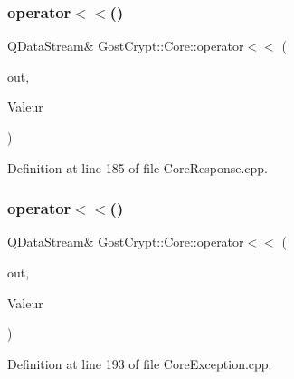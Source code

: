 \mbox{\label{namespace_gost_crypt_1_1_core_a160514e5b1de3db29b884733543a04d0}} 
\subsubsection{\texorpdfstring{operator$<$$<$()}{operator<<()}\hspace{0.1cm}{\footnotesize\ttfamily [33/56]}}
{\footnotesize\ttfamily Q\+Data\+Stream\& Gost\+Crypt\+::\+Core\+::operator$<$$<$ (\begin{DoxyParamCaption}\item[{Q\+Data\+Stream \&}]{out,  }\item[{const \hyperlink{struct_gost_crypt_1_1_core_1_1_host_device}{Host\+Device} \&}]{Valeur }\end{DoxyParamCaption})}



Definition at line 185 of file Core\+Response.\+cpp.

\mbox{\label{namespace_gost_crypt_1_1_core_af50154c27c4dd88f7d66319d7897db4b}} 
\subsubsection{\texorpdfstring{operator$<$$<$()}{operator<<()}\hspace{0.1cm}{\footnotesize\ttfamily [34/56]}}
{\footnotesize\ttfamily Q\+Data\+Stream\& Gost\+Crypt\+::\+Core\+::operator$<$$<$ (\begin{DoxyParamCaption}\item[{Q\+Data\+Stream \&}]{out,  }\item[{const \hyperlink{class_gost_crypt_1_1_core_1_1_formatting_sub_exception}{Gost\+Crypt\+::\+Core\+::\+Formatting\+Sub\+Exception} \&}]{Valeur }\end{DoxyParamCaption})}



Definition at line 193 of file Core\+Exception.\+cpp.

\mbox{\label{namespace_gost_crypt_1_1_core_a64f3dabf952016ead51ad109863e438e}} 
